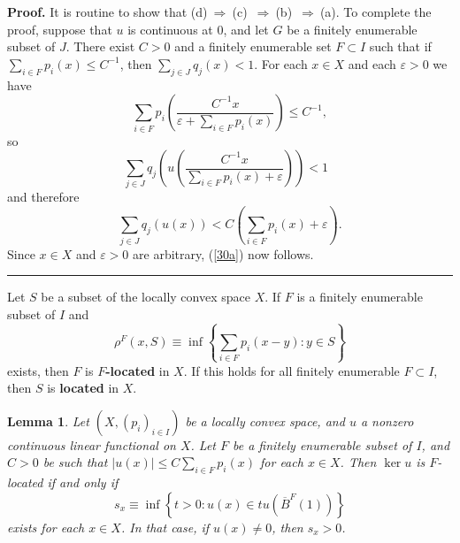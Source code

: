 \documentclass{article}%
\newtheorem{lemma}[theorem]{Lemma}
\newenvironment{proof}[1][Proof]{\noindent\textbf{#1.} }{\ \rule{0.5em}{0.5em}}
\begin{document}
\begin{proof}
It is routine to show that (d)$\ \Rightarrow\ $(c)\ $\Rightarrow
\ $(b)\ $\Rightarrow\ $(a). To complete the proof, suppose that $u$ is
continuous at $0$, and let $G$ be a finitely enumerable subset of $J$. There
exist $C>0$ and a finitely enumerable set $F\subset I$ such that if
$\sum_{i\in F}p_{i}(x)\leq C^{-1}$, then $\sum_{j\in J}q_{j}(x)<1$. For each
$x\in X$ and each $\varepsilon>0$ we have%
\[
\sum_{i\in F}p_{i}\left(  \frac{C^{-1}x}{\varepsilon+\sum_{i\in F}p_{i}%
(x)}\right)  \leq C^{-1},
\]
so%
\[
\sum_{j\in J}q_{j}\left(  u\left(  \frac{C^{-1}x}{\sum_{i\in F}p_{i}%
(x)+\varepsilon}\right)  \right)  <1\text{ }%
\]
and therefore%
\[
\sum_{j\in J}q_{j}(u(x))<C\left(  \sum_{i\in F}p_{i}(x)+\varepsilon\right)  .
\]
Since $x\in X$ and $\varepsilon>0$ are arbitrary, (\ref{30a}) now follows.
\end{proof}

%

\medskip


Let $S$ be a subset of the locally convex space $X$. If $F$ is a finitely
enumerable subset of $I$ and%
\[
\rho^{F}(x,S)\equiv\inf\left\{  \sum_{i\in F}p_{i}(x-y):y\in S\right\}
\]
exists, then $F$ is $F$\textbf{-located} in $X$. If this holds for all
finitely enumerable $F\subset I$, then $S$ is \textbf{located }in $X$.

\begin{lemma}
\label{l32}Let $\left(  X,\left(  p_{i}\right)  _{i\in I}\right)  $ be a
locally convex space, and $u$ a nonzero continuous linear functional on $X$.
Let $F$ be a finitely enumerable subset of $I$, and $C>0$ be such that
$\left\vert u(x)\right\vert \leq C\sum_{i\in F}p_{i}(x)$ for each $x\in X$.
Then $\ker u$ is $F$-located if and only if%
\[
s_{x}\equiv\inf\left\{  t>0:u(x)\in tu(\overline{B}^{F}(1))\right\}
\]
exists for each $x\in X$. In that case, if $u(x)\neq0$, then $s_{x}>0$.
\end{lemma}
\end{document}
